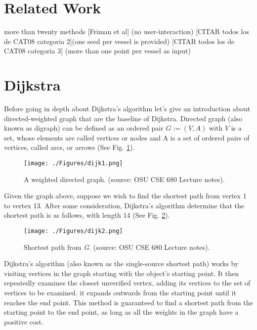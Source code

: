 \section{Related Work}

more than twenty methods 
[Friman et al] (no user-interaction)
 [CITAR todos los de CAT08 categoria 2](one seed per vessel is provided)
[CITAR todos los de CAT08 categoria 3]  (more than one point per vessel as input)


\section{Dijkstra}\label{cent:dijk}

Before going in depth about Dijkstra's algorithm \citep{Dijkstra1959} let's give an introduction about
directed-weighted graph that are the baseline of Dijkstra.
Directed graph (also known as digraph) can be defined as an ordered pair $G:= (V,A)$ with $V$ is a set, whose elements are called vertices or nodes and A is a set of ordered pairs of vertices, called arcs, or arrows (See Fig. \ref{fig:dijk1}). 

\begin{figure}[ht]
	\centering
		\texttt{[image: ./Figures/dijk1.png]}
	\caption[Weighted Directed Graph]{A weighted directed graph.
	 (source: OSU CSE 680 Lecture notes).}
	\label{fig:dijk1}
\end{figure}

Given the graph above, suppose we wish to find the shortest path from vertex 1 to vertex 13. After some consideration, Dijkstra's algorithm determine that the shortest path is as follows, with length 14 (See Fig. \ref{fig:dijk2}). 
\begin{figure}[ht]
	\centering
		\texttt{[image: ./Figures/dijk2.png]}
	\caption[Shortest Path of a Directed Graph]{Shortest path from \textit{G}. (source: OSU CSE 680 Lecture notes).}
	\label{fig:dijk2}
\end{figure}

Dijkstra's algorithm (also known as the single-source shortest path) works by visiting vertices in the graph starting with the object’s starting point. It then repeatedly examines the closest unverified vertex, adding its vertices to the set of vertices to be examined. it expands outwards from the starting point until it reaches the end point. This method is guaranteed to find a shortest path from the starting point to the end point, as long as all the weights in the graph have a positive cost.

